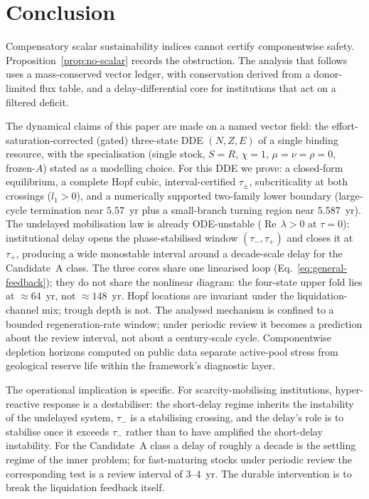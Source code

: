 \documentclass[11pt]{article}
\theoremstyle{definition}
\begin{document}
\section{Conclusion}

Compensatory scalar sustainability indices cannot certify componentwise safety. Proposition~\ref{prop:no-scalar} records the obstruction. The analysis that follows uses a mass-conserved vector ledger, with conservation derived from a donor-limited flux table, and a delay-differential core for institutions that act on a filtered deficit.

The dynamical claims of this paper are made on a named vector field: the effort-saturation-corrected (gated) three-state DDE $(N,Z,E)$ of a single binding resource, with the specialisation (single stock, $S=R$, $\chi=1$, $\mu=\nu=\rho=0$, frozen-$A$) stated as a modelling choice. For this DDE we prove: a closed-form equilibrium, a complete Hopf cubic, interval-certified $\tau_\pm$, subcriticality at both crossings ($l_1>0$), and a numerically supported two-family lower boundary (large-cycle termination near $5.57$~yr plus a small-branch turning region near $5.587$~yr). The undelayed mobilisation law is already ODE-unstable ($\operatorname{Re}\,\lambda>0$ at $\tau=0$): institutional delay opens the phase-stabilised window $(\tau_-,\tau_+)$ and closes it at $\tau_+$, producing a wide monostable interval around a decade-scale delay for the Candidate~A class. The three cores share one linearised loop (Eq.~\eqref{eq:general-feedback}); they do not share the nonlinear diagram: the four-state upper fold lies at $\approx 64$~yr, not $\approx 148$~yr. Hopf locations are invariant under the liquidation-channel mix; trough depth is not. The analysed mechanism is confined to a bounded regeneration-rate window; under periodic review it becomes a prediction about the review interval, not about a century-scale cycle. Componentwise depletion horizons computed on public data separate active-pool stress from geological reserve life within the framework's diagnostic layer.

The operational implication is specific. For scarcity-mobilising institutions, hyper-reactive response is a destabiliser: the short-delay regime inherits the instability of the undelayed system, $\tau_-$ is a stabilising crossing, and the delay's role is to stabilise once it exceeds $\tau_-$ rather than to have amplified the short-delay instability. For the Candidate~A class a delay of roughly a decade is the settling regime of the inner problem; for fast-maturing stocks under periodic review the corresponding test is a review interval of $3$--$4$~yr. The durable intervention is to break the liquidation feedback itself.
\end{document}
